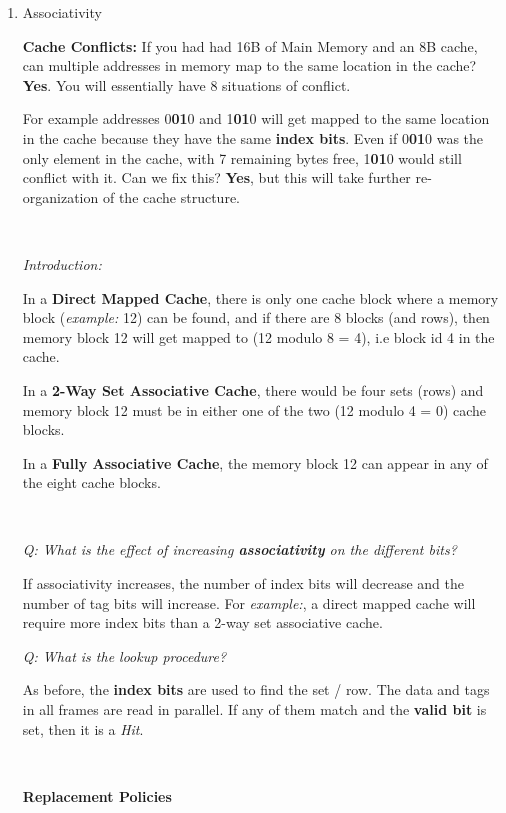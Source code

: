 \documentclass[12pt]{article}
\newenvironment{QandA}{\begin{enumerate}[label=\bfseries\arabic*.]\bfseries}
                      {\end{enumerate}}
\newenvironment{answered}{\par\quad\normalfont}{}
\begin{document}
\begin{QandA}
\begin{answered}
\end{answered}

\item Associativity
\begin{answered}
\textbf{Cache Conflicts:} If you had had 16B of Main Memory and an 8B cache, can multiple addresses in memory map to the same location in the cache? \textbf{Yes}. You will essentially have 8 situations of conflict.

For example addresses 0\textbf{01}0 and 1\textbf{01}0 will get mapped to the same location in the cache because they have the same \textbf{index bits}. Even if 0\textbf{01}0 was the only element in the cache, with 7 remaining bytes free, 1\textbf{01}0 would still conflict with it. Can we fix this? \textbf{Yes}, but this will take further re-organization of the cache structure.

\ 

\textit{Introduction:}

In a \textbf{Direct Mapped Cache}, there is only one cache block where a memory block (\textit{example:} 12) can be found, and if there are 8 blocks (and rows), then memory block 12 will get mapped to (12 modulo 8 = 4), i.e block id 4 in the cache. 

In a \textbf{2-Way Set Associative Cache}, there would be four sets (rows) and memory block 12 must be in either one of the two (12 modulo 4 = 0) cache blocks. 

In a \textbf{Fully Associative Cache}, the memory block 12 can appear in any of the eight cache blocks. 

\

\textit{Q: What is the effect of increasing \textbf{associativity} on the different bits?}

\quad If associativity increases, the number of index bits will decrease and the number of tag bits will increase. For \textit{example:}, a direct mapped cache will require more index bits than a 2-way set associative cache. 

\textit{Q: What is the lookup procedure?}

\quad As before, the \textbf{index bits} are used to find the set / row. The data and tags in all frames are read in parallel. If any of them match and the \textbf{valid bit} is set, then it is a \textit{Hit}. 

\

\textbf{Replacement Policies}


\end{answered}
\end{QandA}
\end{document}

